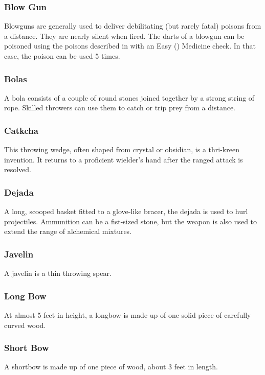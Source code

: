 \begin{multicols}{2}

\subsubsection{Blow Gun}
\label{itmrng:blowgun}
Blowguns are generally used to deliver debilitating (but rarely fatal) poisons from a distance. They are nearly silent when fired. The darts of a
blowgun can be poisoned using the poisons described in  with an Easy (\difficulty) Medicine check. In that case, the poison
can be used 5 times.

\subsubsection{Bolas}
\label{itmrng:bolas}
A bola consists of a couple of round stones joined together by a strong string of rope. Skilled throwers can use them to catch or trip prey from a distance.

\subsubsection{Catkcha}
\label{itmrng:catkcha}
This throwing wedge, often shaped from crystal or obsidian, is a thri-kreen invention. It returns to a proficient wielder’s hand after the ranged attack is resolved.

\subsubsection{Dejada}
\label{itmrng:dejada}
A long, scooped basket fitted to a glove-like bracer, the dejada is used to hurl projectiles. Ammunition can be a fist-sized stone, but the weapon is also used to extend the range of alchemical mixtures.

\subsubsection{Javelin}
\label{itmrng:javelin}
A javelin is a thin throwing spear.

\subsubsection{Long Bow}
\label{itmrng:longbow}
At almost 5 feet in height, a longbow is made up of one solid piece of carefully curved wood.

\subsubsection{Short Bow}
\label{itmrng:shortbow}
A shortbow is made up of one piece of wood, about 3 feet in length.

\end{multicols}
